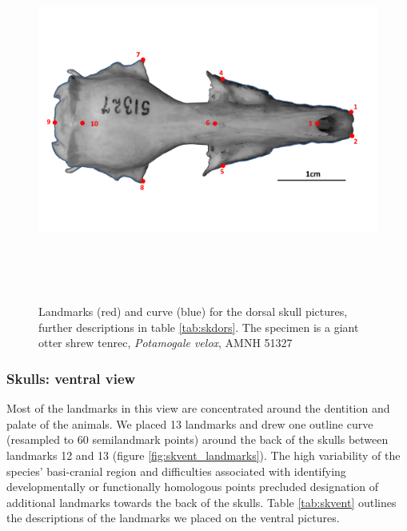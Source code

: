 \documentclass[12pt,a4paper]{article}
\begin{document}
	\begin{figure}[!htb] 
 	\centering
  	\includegraphics[width=12cm, height=12cm, keepaspectratio=true]
  	{figures/AMNH_51327_dorsallandmarksdiagram.png}    
    \caption {Landmarks (red) and curve (blue) for the dorsal skull pictures, further descriptions in table \ref{tab:skdors}. The specimen is a giant otter shrew tenrec, \textit{Potamogale velox}, AMNH 51327}
  	\label{fig:skdors_landmarks}
  	\end{figure}

	\begin{table}[!htb]			
	\centering
	\caption{Descriptions of the landmarks (points) and curves (semilandmarks) for the skulls in dorsal view (see Figure \ref{fig:skdors_landmarks}).}
	 
	\label{tab:skdors}  
	\end{table}

\newpage
\subsubsection{Skulls: ventral view}
	Most of the landmarks in this view are concentrated around the dentition and palate of the animals. We placed 13 landmarks and drew one outline curve (resampled to 60 semilandmark points) around the back of the skulls between landmarks 12 and 13 (figure \ref{fig:skvent_landmarks}). The high variability of the species' basi-cranial region and difficulties associated with identifying developmentally or functionally homologous points precluded designation of additional landmarks towards the back of the skulls. Table \ref{tab:skvent} outlines the descriptions of the landmarks we placed on the ventral pictures.
\end{document}
